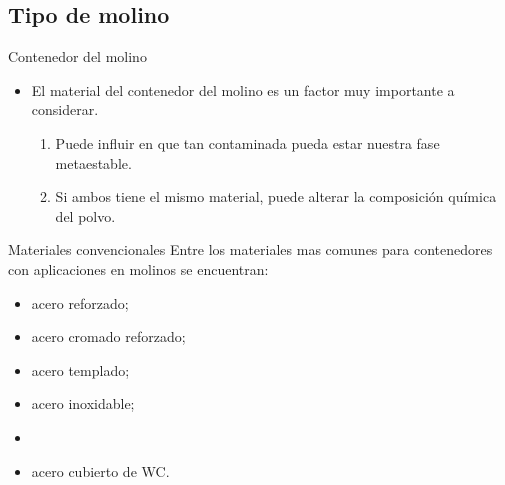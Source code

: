 \documentclass[%
spanish,
    progressbar=head,
background=dark,
subsectionpage
]{beamer}
\begin{document}
\subsection{Tipo de molino}

\begin{frame}{Contenedor del molino}
\begin{itemize}
    \item El material del contenedor del molino es un factor muy importante a considerar.
    \begin{enumerate}
        \item Puede influir en que tan contaminada pueda estar nuestra fase metaestable.
        \item Si ambos tiene el mismo material, puede alterar la composición química del polvo.
    \end{enumerate}
\end{itemize}
\end{frame}

\begin{frame}{Materiales convencionales}
    Entre los materiales mas comunes para contenedores con aplicaciones en molinos se encuentran:
    \begin{itemize}
        \item acero reforzado;
        \item acero cromado reforzado;
        \item acero templado;
        \item acero inoxidable;
        \item {}
        \item acero cubierto de WC.
    \end{itemize}
\end{frame}
\end{document}
